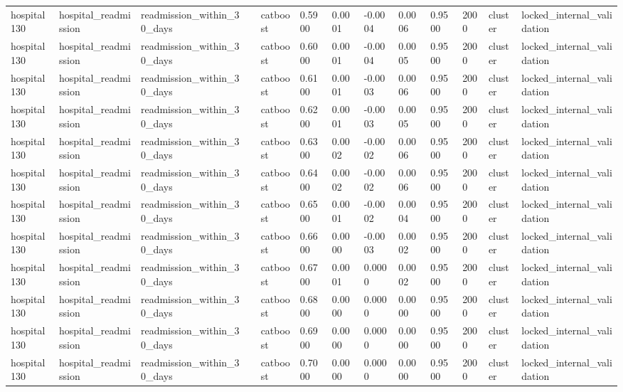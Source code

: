 \begin{tabular}{lllllllllllll}
hospital130 & hospital\_readmission & readmission\_within\_30\_days &  & catboost & 0.5900 & 0.0001 & -0.0004 & 0.0006 & 0.9500 & 2000 & cluster & locked\_internal\_validation \\
hospital130 & hospital\_readmission & readmission\_within\_30\_days &  & catboost & 0.6000 & 0.0001 & -0.0004 & 0.0005 & 0.9500 & 2000 & cluster & locked\_internal\_validation \\
hospital130 & hospital\_readmission & readmission\_within\_30\_days &  & catboost & 0.6100 & 0.0001 & -0.0003 & 0.0006 & 0.9500 & 2000 & cluster & locked\_internal\_validation \\
hospital130 & hospital\_readmission & readmission\_within\_30\_days &  & catboost & 0.6200 & 0.0001 & -0.0003 & 0.0005 & 0.9500 & 2000 & cluster & locked\_internal\_validation \\
hospital130 & hospital\_readmission & readmission\_within\_30\_days &  & catboost & 0.6300 & 0.0002 & -0.0002 & 0.0006 & 0.9500 & 2000 & cluster & locked\_internal\_validation \\
hospital130 & hospital\_readmission & readmission\_within\_30\_days &  & catboost & 0.6400 & 0.0002 & -0.0002 & 0.0006 & 0.9500 & 2000 & cluster & locked\_internal\_validation \\
hospital130 & hospital\_readmission & readmission\_within\_30\_days &  & catboost & 0.6500 & 0.0001 & -0.0002 & 0.0004 & 0.9500 & 2000 & cluster & locked\_internal\_validation \\
hospital130 & hospital\_readmission & readmission\_within\_30\_days &  & catboost & 0.6600 & 0.0000 & -0.0003 & 0.0002 & 0.9500 & 2000 & cluster & locked\_internal\_validation \\
hospital130 & hospital\_readmission & readmission\_within\_30\_days &  & catboost & 0.6700 & 0.0001 & 0.0000 & 0.0002 & 0.9500 & 2000 & cluster & locked\_internal\_validation \\
hospital130 & hospital\_readmission & readmission\_within\_30\_days &  & catboost & 0.6800 & 0.0000 & 0.0000 & 0.0000 & 0.9500 & 2000 & cluster & locked\_internal\_validation \\
hospital130 & hospital\_readmission & readmission\_within\_30\_days &  & catboost & 0.6900 & 0.0000 & 0.0000 & 0.0000 & 0.9500 & 2000 & cluster & locked\_internal\_validation \\
hospital130 & hospital\_readmission & readmission\_within\_30\_days &  & catboost & 0.7000 & 0.0000 & 0.0000 & 0.0000 & 0.9500 & 2000 & cluster & locked\_internal\_validation \\

\end{tabular}
